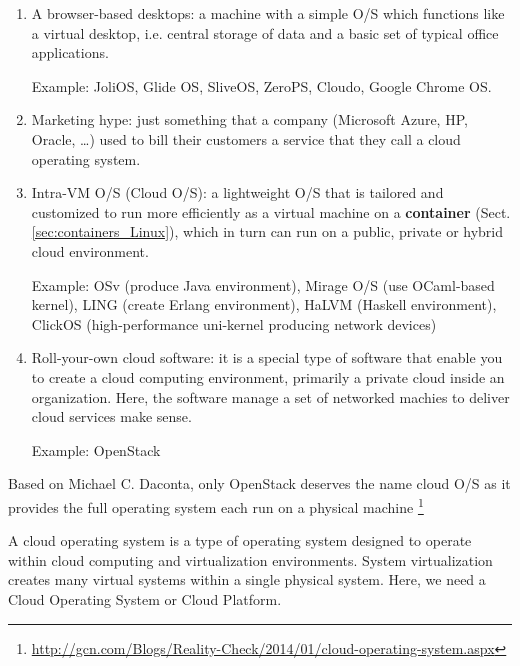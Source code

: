 \begin{enumerate}
  \item A browser-based desktops: a machine with a simple O/S which functions
  like a virtual desktop, i.e. central storage of data and a basic set of
  typical office applications.
  
  Example: JoliOS, Glide OS, SliveOS, ZeroPS, Cloudo, Google Chrome OS.
  
  \item Marketing hype: just something that a company (Microsoft Azure, HP,
  Oracle, \ldots) used to bill their customers a service that they call a cloud
  operating system.
  
  
  \item Intra-VM O/S (Cloud O/S): a lightweight O/S that is tailored and
  customized to run more efficiently as a virtual machine on a {\bf container}
  (Sect.\ref{sec:containers_Linux}), which in turn can run on a public, private
  or hybrid cloud environment.
  
  Example: OSv (produce Java environment), Mirage O/S (use
  OCaml-based kernel), LING (create Erlang environment), HaLVM (Haskell
  environment), ClickOS (high-performance uni-kernel producing network devices)

  \item Roll-your-own cloud software: it is a special type of software that
  enable you to create a cloud computing environment, primarily a private cloud
  inside an organization. Here, the software manage a set of networked machies
  to deliver cloud services make sense. 
  
  Example: OpenStack
  
  
\end{enumerate}
Based on Michael C. Daconta, only OpenStack deserves the name cloud O/S as it
provides the full operating system each run on a physical machine
\footnote{\url{http://gcn.com/Blogs/Reality-Check/2014/01/cloud-operating-system.aspx}}


A cloud operating system is a type of operating system designed to operate
within cloud computing and virtualization environments. System virtualization
creates many virtual systems within a single physical system. Here, we need a
Cloud Operating System or Cloud Platform. 


